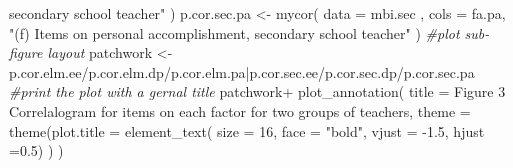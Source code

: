 \documentclass[
]{article}
\newenvironment{Shaded}{\begin{snugshade}}{\end{snugshade}}
\newcommand{\AttributeTok}[1]{\textcolor[rgb]{0.77,0.63,0.00}{#1}}
\newcommand{\CommentTok}[1]{\textcolor[rgb]{0.56,0.35,0.01}{\textit{#1}}}
\newcommand{\DecValTok}[1]{\textcolor[rgb]{0.00,0.00,0.81}{#1}}
\newcommand{\FloatTok}[1]{\textcolor[rgb]{0.00,0.00,0.81}{#1}}
\newcommand{\FunctionTok}[1]{\textcolor[rgb]{0.00,0.00,0.00}{#1}}
\newcommand{\NormalTok}[1]{#1}
\newcommand{\OtherTok}[1]{\textcolor[rgb]{0.56,0.35,0.01}{#1}}
\newcommand{\SpecialCharTok}[1]{\textcolor[rgb]{0.00,0.00,0.00}{#1}}
\newcommand{\StringTok}[1]{\textcolor[rgb]{0.31,0.60,0.02}{#1}}
\begin{document}
\begin{Shaded}
\begin{Highlighting}[]
\StringTok{         secondary school teacher"}
\NormalTok{         )}
\NormalTok{p.cor.sec.pa }\OtherTok{\textless{}{-}} 
       \FunctionTok{mycor}\NormalTok{(}
         \AttributeTok{data =}\NormalTok{ mbi.sec ,}
         \AttributeTok{cols =}\NormalTok{ fa.pa, }
         \StringTok{"(f) Items on personal accomplishment,}
\StringTok{          secondary school teacher"}
\NormalTok{         )}
\CommentTok{\#plot sub{-}figure layout}
\NormalTok{patchwork }\OtherTok{\textless{}{-}} 
\NormalTok{  p.cor.elm.ee}\SpecialCharTok{/}\NormalTok{p.cor.elm.dp}\SpecialCharTok{/}\NormalTok{p.cor.elm.pa}\SpecialCharTok{|}\NormalTok{p.cor.sec.ee}\SpecialCharTok{/}\NormalTok{p.cor.sec.dp}\SpecialCharTok{/}\NormalTok{p.cor.sec.pa }
\CommentTok{\#print the plot with a gernal title}
\NormalTok{patchwork}\SpecialCharTok{+}
  \FunctionTok{plot\_annotation}\NormalTok{(}
    \AttributeTok{title =} 
      \StringTok{\textquotesingle{}Figure 3 Correlalogram for items on each factor for two groups of teachers\textquotesingle{}}\NormalTok{,}
    \AttributeTok{theme =} 
      \FunctionTok{theme}\NormalTok{(}\AttributeTok{plot.title =} 
              \FunctionTok{element\_text}\NormalTok{(}
                \AttributeTok{size =} \DecValTok{16}\NormalTok{,}
                \AttributeTok{face =} \StringTok{"bold"}\NormalTok{,}
                \AttributeTok{vjust =} \SpecialCharTok{{-}}\FloatTok{1.5}\NormalTok{,}
                \AttributeTok{hjust =}\FloatTok{0.5}\NormalTok{)}
\NormalTok{            )}
\NormalTok{    )}
\end{Highlighting}
\end{Shaded}
\end{document}
